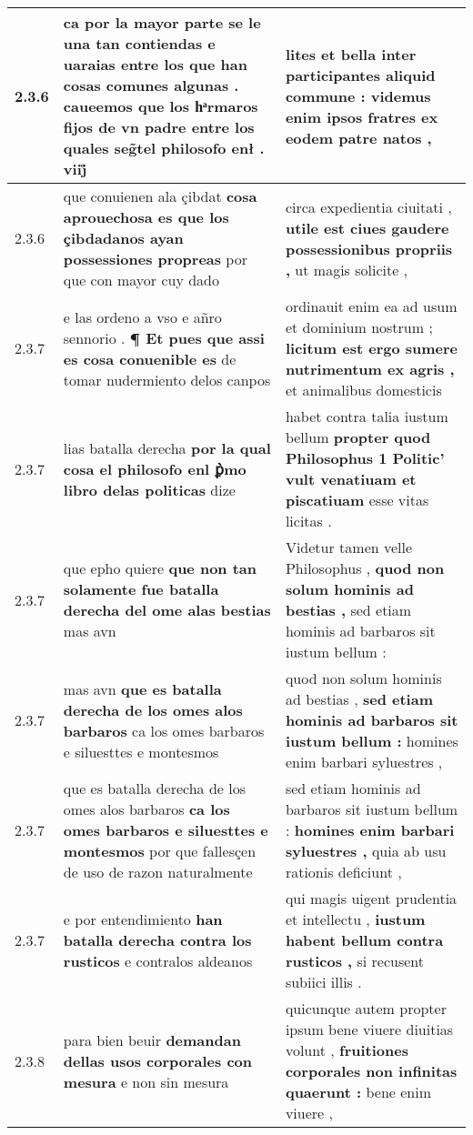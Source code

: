 \begin{tabular}{|p{1cm}|p{6.5cm}|p{6.5cm}|}
2.3.6 & ca por la mayor parte se le una tan contiendas e uaraias \textbf{ entre los que han cosas comunes algunas . } caueemos que los hͣrmaros fijos de vn padre entre los quales seg̃tel philosofo enł . viij̊ & lites et bella \textbf{ inter participantes aliquid commune : } videmus enim ipsos fratres ex eodem patre natos , \\\hline
2.3.6 & que conuienen ala çibdat \textbf{ cosa aprouechosa es que los çibdadanos ayan possessiones propreas } por que con mayor cuy dado & circa expedientia ciuitati , \textbf{ utile est ciues gaudere possessionibus propriis , } ut magis solicite , \\\hline
2.3.7 & e las ordeno a vso e añro sennorio . \textbf{ ¶ Et pues que assi es cosa conuenible es } de tomar nudermiento delos canpos & ordinauit enim ea ad usum et dominium nostrum ; \textbf{ licitum est ergo sumere nutrimentum ex agris , } et animalibus domesticis \\\hline
2.3.7 & lias batalla derecha \textbf{ por la qual cosa el philosofo enl ꝑ̀mo libro delas politicas } dize & habet contra talia iustum bellum \textbf{ propter quod Philosophus 1 Politic’ vult venatiuam et piscatiuam } esse vitas licitas . \\\hline
2.3.7 & que epho quiere \textbf{ que non tan solamente fue batalla derecha del ome alas bestias } mas avn & Videtur tamen velle Philosophus , \textbf{ quod non solum hominis ad bestias , } sed etiam hominis ad barbaros sit iustum bellum : \\\hline
2.3.7 & mas avn \textbf{ que es batalla derecha de los omes alos barbaros } ca los omes barbaros e siluesttes e montesmos & quod non solum hominis ad bestias , \textbf{ sed etiam hominis ad barbaros sit iustum bellum : } homines enim barbari syluestres , \\\hline
2.3.7 & que es batalla derecha de los omes alos barbaros \textbf{ ca los omes barbaros e siluesttes e montesmos } por que fallesçen de uso de razon naturalmente & sed etiam hominis ad barbaros sit iustum bellum : \textbf{ homines enim barbari syluestres , } quia ab usu rationis deficiunt , \\\hline
2.3.7 & e por entendimiento \textbf{ han batalla derecha contra los rusticos } e contralos aldeanos & qui magis uigent prudentia et intellectu , \textbf{ iustum habent bellum contra rusticos , } si recusent subiici illis . \\\hline
2.3.8 & para bien beuir \textbf{ demandan dellas usos corporales con mesura } e non sin mesura & quicunque autem propter ipsum bene viuere diuitias volunt , \textbf{ fruitiones corporales non infinitas quaerunt : } bene enim viuere , \\\hline

\end{tabular}
